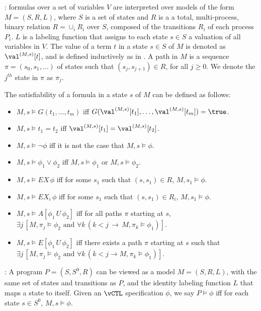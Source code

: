 : \vCTL formulas over a set of variables $V$
are interpreted over models of the form $M = (S, R, L)$, where $S$ is
a set of states and $R$ is a a total, multi-process, binary relation
$R = \cup_i R_i$ over $S$, composed of the transitions $R_i$ of 
each process $P_i$. $L$ is a labeling function that assigns to each
state $s \in S$ a valuation of all variables in $V$.  The value of a
term $t$ in a state $s \in S$ of $M$ is denoted as $\val^{(M,s)}[t]$,
and is defined inductively as in . A path in $M$ is a
sequence $\pi = (s_0, s_1, \ldots)$ of states such that $(s_j,
s_{j+1}) \in R$, for all $j \geq 0$. We denote the $j^{th}$ state in
$\pi$ as $\pi_j$. 



The satisfiability of a \vCTL formula in a state $s$ of $M$
can be defined as follows:

\begin{itemize}
\item $M,s \models G(t_1, \ldots, t_m)$ iff  $G(\val^{(M,s)}[t_1], \ldots,
\val^{(M,s)}[t_m]) = \true$. 
\item $M,s \models t_1 = t_2$ iff $\val^{(M,s)}[t_1] =
\val^{(M,s)}[t_2]$.
\item $M,s \models \neg \phi$ iff it is not the case that $M,s \models
\phi$.
\item $M,s \models \phi_1 \vee \phi_2$ iff $M,s \models \phi_1$ or
$M,s \models \phi_2$.
\item $M,s \models EX \, \phi$ iff for some $s_1$ such that  $(s,s_1)
\in R$, $M,s_1 \models \phi$. 
\item $M,s \models EX_i \, \phi$ iff for some $s_1$ such that
$(s,s_1) \in R_i$, $M,s_1 \models \phi$. 
\item $M,s \models A[\phi_1 \, U \, \phi_2]$ iff for all paths $\pi$
starting at $s$, $\exists j \, [M,\pi_j \models \phi_2 \text{ and }
\forall k \, (k < j \, \to \, M,\pi_k \models \phi_1)]$.
\item $M,s \models E[\phi_1 \, U \, \phi_2]$ iff there exists a path $\pi$
starting at $s$ such that $\exists j \, [M,\pi_j \models \phi_2 \text{ and }
\forall k \, (k < j \to M,\pi_k \models \phi_1)]$.\\
\end{itemize}



:
A program $P = (S,S^0,R)$ can be viewed as a model $M = (S,R,L)$, with
the same set of states and transitions as $P$, and the identity labeling
function $L$ that maps a state to itself. Given an $\vCTL$
specification $\phi$, we say $P \models \phi$ iff for each state $s
\in S^0$, $M,s \models \phi$. 



